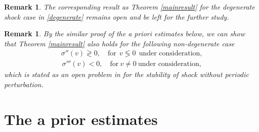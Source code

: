 \documentclass[12pt,reqno]{amsart}
\numberwithin{equation}{section}
\newtheorem{remark}[theorem]{Remark}
\begin{document}
\begin{remark}
	The corresponding result as Theorem \ref{mainresult} for the degenerate shock case in \eqref{degenerate} remains open and be left for the further study.
\end{remark}
\begin{remark}
	By the similar proof of the a priori estimates below, we can show that Theorem \ref{mainresult}  also holds for the following non-degenerate case
	\begin{equation*}
		\begin{aligned}
			\sigma''(v)\gtrless 0,\quad \text{for} ~~ v\lessgtr 0 ~~\text{under consideration,}
		\end{aligned}
	\end{equation*}
	\begin{equation*}
		\begin{aligned}
		    \sigma'''(v)<0, \quad \text{for}~ v\neq0~\text{under consideration,}
	    \end{aligned}
	\end{equation*}
	which is stated as an open problem in \cite{InitialModel} for the stability of shock without periodic perturbation.
\end{remark}
\section{The a prior estimates}\label{section3}
\end{document}

